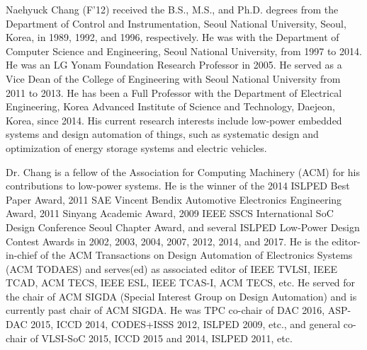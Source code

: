 \documentclass{IEEEtran}
\begin{document}
\begin{IEEEbiography}{Naehyuck Chang}
(F’12) received the B.S., M.S., and Ph.D. degrees from the Department of Control and Instrumentation, Seoul National University, Seoul, Korea, in 1989, 1992, and 1996, respectively. He was with the Department of Computer Science and Engineering, Seoul National University, from 1997 to 2014. He was an LG Yonam Foundation Research Professor in 2005. He served as a Vice Dean of the College of Engineering with Seoul National University from 2011 to 2013. He has been a Full Professor with the Department of Electrical Engineering, Korea Advanced Institute of Science and Technology, Daejeon, Korea, since 2014. His current research interests include low-power embedded systems and design automation of things, such as systematic design and optimization of energy storage systems and electric vehicles.

Dr. Chang is a fellow of the Association for Computing Machinery (ACM) for his contributions to low-power systems. He is the winner of the 2014 ISLPED Best Paper Award, 2011 SAE Vincent Bendix Automotive Electronics Engineering Award, 2011 Sinyang Academic Award, 2009 IEEE SSCS International SoC Design Conference Seoul Chapter Award, and several ISLPED Low-Power Design Contest Awards in 2002, 2003, 2004, 2007, 2012, 2014, and 2017. He is the editor-in-chief of the ACM Transactions on Design Automation of Electronics Systems (ACM TODAES) and serves(ed) as associated editor of IEEE TVLSI, IEEE TCAD, ACM TECS, IEEE ESL, IEEE TCAS-I, ACM TECS, etc. He served for the chair of ACM SIGDA (Special Interest Group on Design Automation) and is currently past chair of ACM SIGDA. He was TPC co-chair of DAC 2016, ASP-DAC 2015, ICCD 2014, CODES+ISSS 2012, ISLPED 2009, etc., and general co-chair of VLSI-SoC 2015, ICCD 2015 and 2014, ISLPED 2011, etc.


\end{IEEEbiography}


\end{document}
